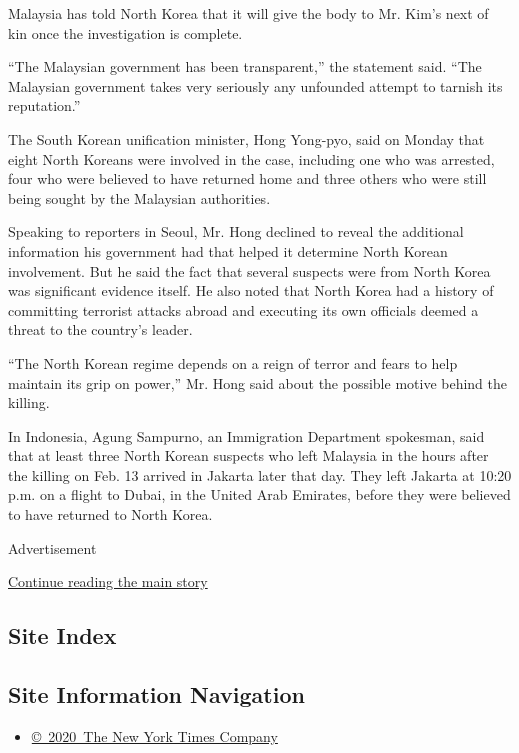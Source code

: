 Malaysia has told North Korea that it will give the body to Mr. Kim's
next of kin once the investigation is complete.

``The Malaysian government has been transparent,'' the statement said.
``The Malaysian government takes very seriously any unfounded attempt to
tarnish its reputation.''

The South Korean unification minister, Hong Yong-pyo, said on Monday
that eight North Koreans were involved in the case, including one who
was arrested, four who were believed to have returned home and three
others who were still being sought by the Malaysian authorities.

Speaking to reporters in Seoul, Mr. Hong declined to reveal the
additional information his government had that helped it determine North
Korean involvement. But he said the fact that several suspects were from
North Korea was significant evidence itself. He also noted that North
Korea had a history of committing terrorist attacks abroad and executing
its own officials deemed a threat to the country's leader.

``The North Korean regime depends on a reign of terror and fears to help
maintain its grip on power,'' Mr. Hong said about the possible motive
behind the killing.

In Indonesia, Agung Sampurno, an Immigration Department spokesman, said
that at least three North Korean suspects who left Malaysia in the hours
after the killing on Feb. 13 arrived in Jakarta later that day. They
left Jakarta at 10:20 p.m. on a flight to Dubai, in the United Arab
Emirates, before they were believed to have returned to North Korea.

Advertisement

\protect\hyperlink{after-bottom}{Continue reading the main story}

\hypertarget{site-index}{%
\subsection{Site Index}\label{site-index}}

\hypertarget{site-information-navigation}{%
\subsection{Site Information
Navigation}\label{site-information-navigation}}

\begin{itemize}
\tightlist
\item
  \href{https://help.nytimes3xbfgragh.onion/hc/en-us/articles/115014792127-Copyright-notice}{©~2020~The
  New York Times Company}
\end{itemize}

